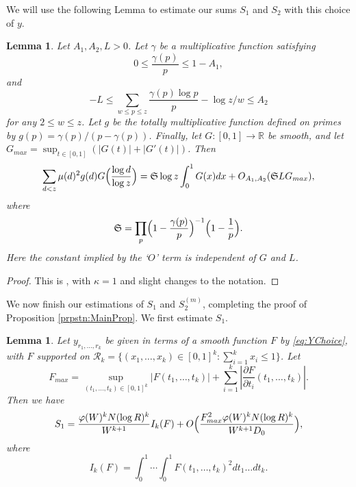 \documentclass[12pt,a4paper]{amsart}
\theoremstyle{plain}
\newtheorem{lmm}[thrm]{Lemma}
\numberwithin{sblmm}{thrm}
\numberwithin{equation}{section}
\renewcommand{\phi}{\varphi}
\begin{document}
We will use the following Lemma to estimate our sums $S_1$ and $S_2$ with this choice of $y$.
\begin{lmm}\label{lmm:PartialSummation}
Let $A_1,A_2,L>0$. Let $\gamma$ be a multiplicative function satisfying
\[0\le \frac{\gamma(p)}{p}\le 1-A_1,\]
and
\[-L\le \sum_{w\le p\le z}\frac{\gamma(p)\log{p}}{p}- \log{z/w}\le A_2\]
for any $2\le w\le z$. Let $g$ be the totally multiplicative function defined on primes by $g(p)=\gamma(p)/(p-\gamma(p))$. Finally, let $G:[0,1]\rightarrow \mathbb{R}$ be smooth, and let $G_{max}=\sup_{t\in [0,1]}(|G(t)|+|G'(t)|)$. Then
\[\sum_{d<z}\mu(d)^2g(d)G\Bigl(\frac{\log{d}}{\log{z}}\Bigr)=\mathfrak{S}\log{z}\int_0^1G(x)dx+O_{A_1,A_2}(\mathfrak{S}LG_{max}),\]
where
\[\mathfrak{S}=\prod_{p}\Bigl(1-\frac{\gamma(p)}{p}\Bigr)^{-1}\Bigl(1-\frac{1}{p}\Bigr).\]
Here the constant implied by the `$O$' term is independent of $G$ and $L$.
\end{lmm}
\begin{proof}
This is \cite[Lemma 4]{GGPY}, with $\kappa=1$ and slight changes to the notation.
\end{proof}
We now finish our estimations of $S_1$ and $S_2^{(m)}$, completing  the proof of Proposition \ref{prpstn:MainProp}. We first estimate $S_1$.
\begin{lmm}\label{lmm:S1Summation2}
Let $y_{r_1,\dotsc,r_k}$ be given in terms of a smooth function $F$ by \eqref{eq:YChoice}, with $F$ supported on $\mathcal{R}_k=\{(x_1,\dotsc,x_k)\in[0,1]^k:\sum_{i=1}^kx_i\le 1\}$. Let 
\[F_{max}=\sup_{(t_1,\dotsc,t_k)\in[0,1]^k}|F(t_1,\dotsc,t_k)|+\sum_{i=1}^k|\frac{\partial F}{\partial t_i}(t_1,\dotsc,t_k)|. \]
Then we have
\[S_1=\frac{\phi(W)^k N (\log{R})^k}{W^{k+1}}I_k(F)+O\Bigl(\frac{F_{max}^2 \phi(W)^{k} N (\log{R})^k}{W^{k+1} D_0}\Bigr),\]
where
\[I_k(F)=\int_0^1\dotsi\int_0^1F(t_1,\dotsc,t_k)^2dt_1\dotsc dt_k.\]
\end{lmm}
\end{document}
